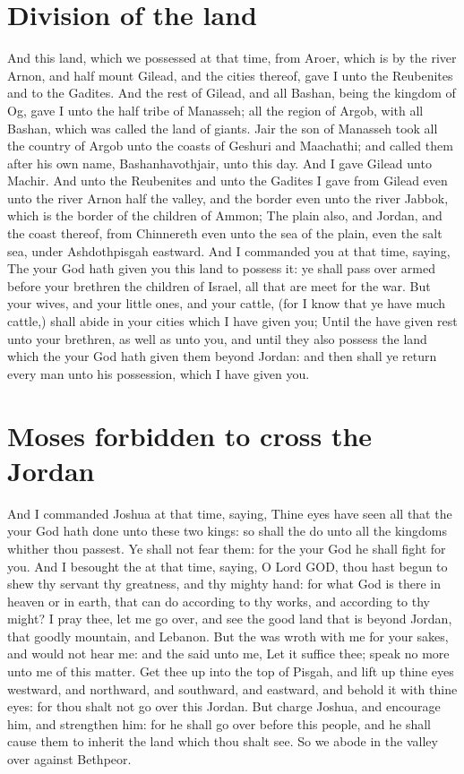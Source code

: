 \begin{biblechapter}
\section*{Division of the land}
\verse And this land, which we possessed at that time, from Aroer, which is by the river Arnon, and half mount Gilead, and the cities thereof, gave I unto the Reubenites and to the Gadites.
\verse And the rest of Gilead, and all Bashan, being the kingdom of Og, gave I unto the half tribe of Manasseh; all the region of Argob, with all Bashan, which was called the land of giants.
\verse Jair the son of Manasseh took all the country of Argob unto the coasts of Geshuri and Maachathi; and called them after his own name, Bashanhavothjair, unto this day.
\verse And I gave Gilead unto Machir.
\verse And unto the Reubenites and unto the Gadites I gave from Gilead even unto the river Arnon half the valley, and the border even unto the river Jabbok, which is the border of the children of Ammon;
\verse The plain also, and Jordan, and the coast thereof, from Chinnereth even unto the sea of the plain, even the salt sea, under Ashdothpisgah eastward.
\verse And I commanded you at that time, saying, The \LORD your God hath given you this land to possess it: ye shall pass over armed before your brethren the children of Israel, all that are meet for the war.
\verse But your wives, and your little ones, and your cattle, (for I know that ye have much cattle,) shall abide in your cities which I have given you;
\verse Until the \LORD have given rest unto your brethren, as well as unto you, and until they also possess the land which the \LORD your God hath given them beyond Jordan: and then shall ye return every man unto his possession, which I have given you.
\section*{Moses forbidden to cross the Jordan}
\verse And I commanded Joshua at that time, saying, Thine eyes have seen all that the \LORD your God hath done unto these two kings: so shall the \LORD do unto all the kingdoms whither thou passest.
\verse Ye shall not fear them: for the \LORD your God he shall fight for you.
\verse And I besought the \LORD at that time, saying,
\verse O Lord GOD, thou hast begun to shew thy servant thy greatness, and thy mighty hand: for what God is there in heaven or in earth, that can do according to thy works, and according to thy might?
\verse I pray thee, let me go over, and see the good land that is beyond Jordan, that goodly mountain, and Lebanon.
\verse But the \LORD was wroth with me for your sakes, and would not hear me: and the \LORD said unto me, Let it suffice thee; speak no more unto me of this matter.
\verse Get thee up into the top of Pisgah, and lift up thine eyes westward, and northward, and southward, and eastward, and behold it with thine eyes: for thou shalt not go over this Jordan.
\verse But charge Joshua, and encourage him, and strengthen him: for he shall go over before this people, and he shall cause them to inherit the land which thou shalt see.
\verse So we abode in the valley over against Bethpeor.
\end{biblechapter}

